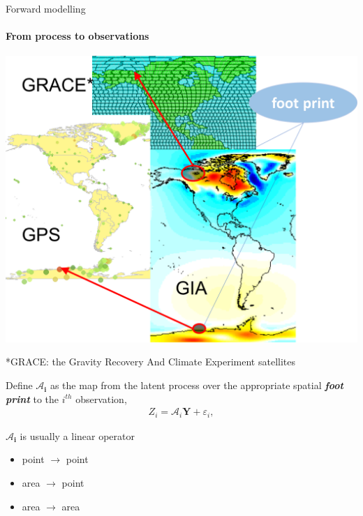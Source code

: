 \documentclass{beamer}
\begin{document}
\begin{frame}{Forward modelling}
\framesubtitle{From process to observations}

\begin{minipage}[c]{0.48\textwidth}
\begin{center}
\includegraphics[width = \textwidth]{images/footprint}
\end{center}
\tiny{*GRACE: the Gravity Recovery And Climate Experiment satellites}

\end{minipage}%
\hfill
\begin{minipage}[c]{0.5\textwidth}
Define $\bm{\mathcal{A}_i}$ as the map from the latent process over the appropriate spatial \emph{\textbf{foot print}} to the $i^{th}$ observation,
\begin{align}\label{eq:GPSi}
Z_i = \bm{\mathcal{A}}_i\bm{Y} + \varepsilon_i, 
\end{align} 

 $\bm{\mathcal{A}_i}$ is usually a linear operator 
 \begin{itemize}
 \item point $\to$ point
 \item area $\to$ point
 \item area $\to$ area
 \end{itemize}
\end{minipage}

\end{frame}
\end{document}
